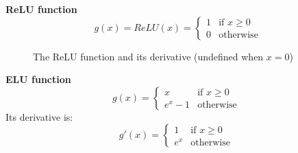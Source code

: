  \noindent \textbf{ReLU function}\\
 \begin{equation}
 g(x) = ReLU(x) = 
 \begin{cases}
    1 & \text{if } x\geq 0\\
    0              & \text{otherwise}
\end{cases}
 \end{equation}
 
 \begin{figure}[h!]
  \begin{center}
    \caption{The ReLU function and its derivative (undefined when $x=0$)}
  \end{center}
\end{figure} 
 
 
 
 
 \noindent \textbf{ELU function}\\
 \begin{equation}
 g(x) = 
 \begin{cases}
    x & \text{if } x\geq 0\\
    e^{x}-1 & \text{otherwise }
\end{cases}
 \end{equation}
 Its derivative is:
 \begin{equation}
g'(x) = 
 \begin{cases}
    1 & \text{if } x\geq 0\\
    e^{x} & \text{otherwise }
\end{cases}
 \end{equation}
 
 

